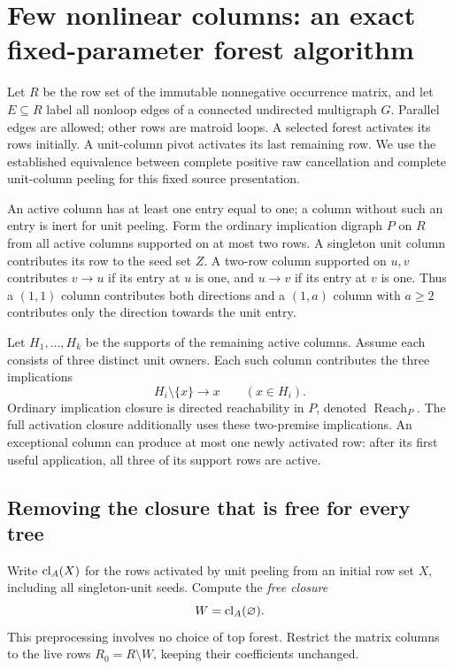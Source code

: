 \section{Few nonlinear columns: an exact fixed-parameter forest algorithm}
\label{sec:fpt-column-theorem}

Let $R$ be the row set of the immutable nonnegative occurrence matrix,
and let $E\subseteq R$ label all nonloop edges of a connected undirected
multigraph $G$. Parallel edges are allowed; other rows are matroid loops. A selected forest
activates its rows initially. A unit-column pivot activates its last
remaining row. We use the established equivalence between complete
positive raw cancellation and complete unit-column peeling for this
fixed source presentation.

An active column has at least one entry equal to one; a column without
such an entry is inert for unit peeling. Form the ordinary implication
digraph $P$ on $R$ from all active columns supported on at most two rows.
A singleton unit column contributes its row to the seed set $Z$.
A two-row column supported on $u,v$ contributes $v\to u$ if its entry
at $u$ is one, and $u\to v$ if its entry at $v$ is one. Thus a
$(1,1)$ column contributes both directions and a $(1,a)$ column with
$a\ge2$ contributes only the direction towards the unit entry.

Let $H_1,\ldots,H_k$ be the supports of the remaining active columns.
Assume each consists of three distinct unit owners. Each such column
contributes the three implications
\[
                  H_i\setminus\{x\}\longrightarrow x
                  \qquad(x\in H_i).
\]
Ordinary implication closure is directed reachability in $P$, denoted
$\operatorname{Reach}_P$. The full activation closure additionally uses
these two-premise implications. An exceptional column can produce at
most one newly activated row: after its first useful application, all
three of its support rows are active.

\subsection{Removing the closure that is free for every tree}

Write $\operatorname{cl}_A(X)$ for the rows activated by unit peeling
from an initial row set $X$, including all singleton-unit seeds. Compute
the \emph{free closure}
\[
                         W=\operatorname{cl}_A(\varnothing).
\]
This preprocessing involves no choice of top forest. Restrict the
matrix columns to the live rows $R_0=R\setminus W$, keeping their
coefficients unchanged.

